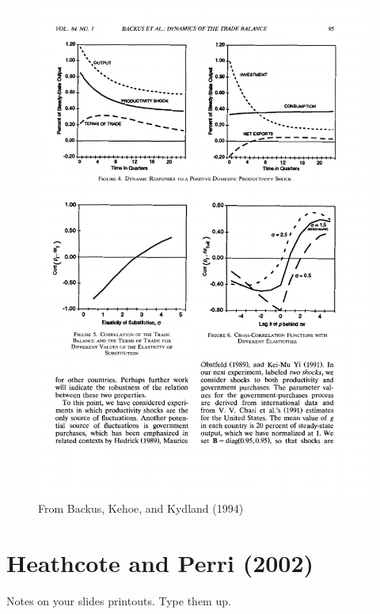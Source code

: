 \documentclass[11pt,pdftex,twoside,letterpaper]{exam}
\begin{document}
\begin{figure}
  \centering
  \caption{From Backus, Kehoe, and Kydland (1994)}\label{fig:bkk-elas}
  \includegraphics[width=\textwidth]{figures/bkk_elasticity.pdf}
\end{figure}

\FloatBarrier
\section{Heathcote and Perri (2002)}
Notes on  your slides printouts. Type them up.
\end{document}
